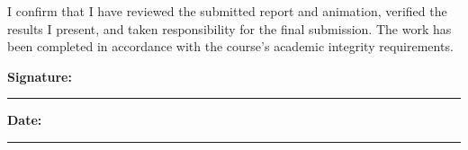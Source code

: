 \documentclass[11pt,a4paper]{article}
\begin{document}
I confirm that I have reviewed the submitted report and animation,
verified the results I present, and taken responsibility for the
final submission. The work has been completed in accordance with
the course's academic integrity requirements.

\vspace{1.5cm}

\noindent
\begin{minipage}{0.48\textwidth}
    \textbf{Signature:}\\[0.3cm]
    \rule{5cm}{0.4pt}
\end{minipage}
\hfill
\begin{minipage}{0.40\textwidth}
    \textbf{Date:}\\[0.3cm]
    \rule{3.5cm}{0.4pt}
\end{minipage}



\end{document}
